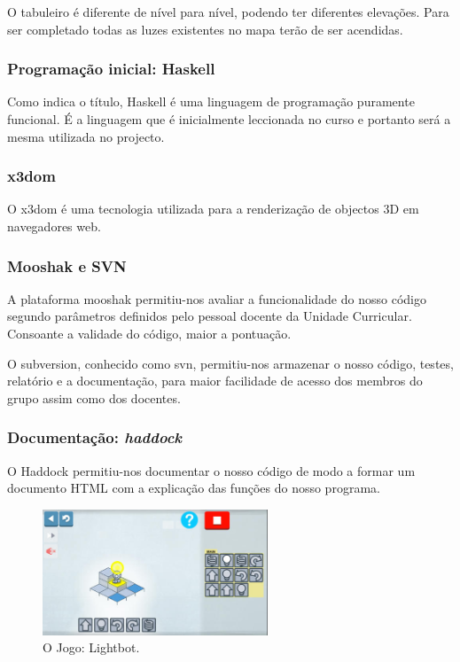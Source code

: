 \documentclass[a4paper]{article}
\begin{document}
O tabuleiro é diferente de nível para nível, podendo ter diferentes elevações. Para ser completado todas as luzes existentes no mapa terão de ser acendidas.


\subsubsection{Programação inicial: Haskell}
Como indica o título, Haskell é uma linguagem de programação puramente funcional. É a linguagem que é inicialmente leccionada no curso e portanto será a mesma utilizada no projecto.

\subsubsection{x3dom}
O x3dom é uma tecnologia utilizada para a renderização de objectos 3D em navegadores web.

\subsubsection{Mooshak e SVN}
A plataforma mooshak permitiu-nos avaliar a funcionalidade do nosso código segundo parâmetros definidos pelo pessoal docente da Unidade Curricular. Consoante a validade do código, maior a pontuação.

O subversion, conhecido como svn, permitiu-nos armazenar o nosso código, testes, relatório e a documentação, para maior facilidade de acesso dos membros do grupo assim como dos docentes.

\subsubsection{Documentação: \textit{haddock}}
O Haddock permitiu-nos documentar o nosso código de modo a formar um documento HTML com a explicação das funções do nosso programa.

\begin{figure}[!ht]
\centering
\includegraphics[width=0.6\textwidth]{lightbot.png}
\caption{\label{fig:figura 1} O Jogo: Lightbot.}
\end{figure}
\end{document}
